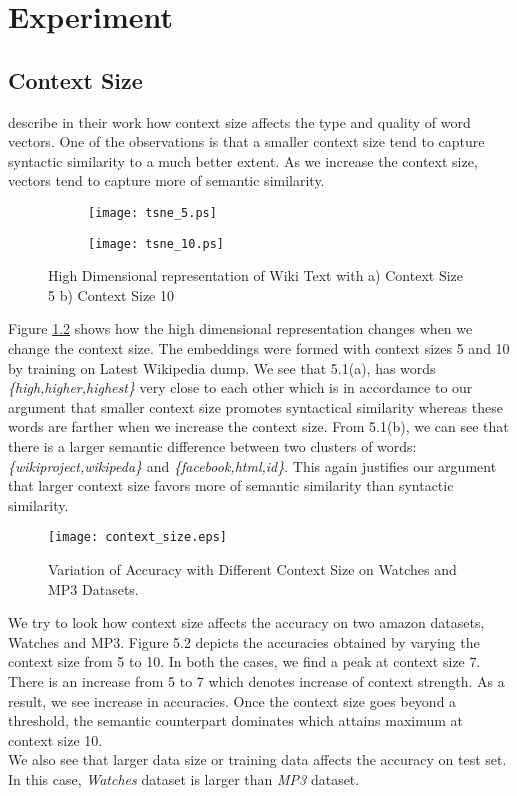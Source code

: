 \chapter{Experiment}
\section{Context Size}
\cite{Mikolov:13a} describe in their work how context size affects the type and quality of word vectors. One of the observations is that a smaller context size tend to capture syntactic similarity to a much better extent. As we increase the context size, vectors tend to capture more of semantic similarity.
\begin{figure}[]
	\centering
	\begin{subfigure}{\linewidth}
	\texttt{[image: tsne\_5.ps]}
	\caption{}
	\label{fig:5K_hindi_zoom1}
	\end{subfigure}
	\newline
	\begin{subfigure}{\linewidth}
	\texttt{[image: tsne\_10.ps]}
	\caption{}
	\end{subfigure}
	\newline
	\caption{High Dimensional representation of Wiki Text with a) Context Size 5 b) Context Size 10}
	\label{fig:tsne_5_10}
\end{figure}

Figure \ref{fig:tsne_5_10} shows how the high dimensional representation changes when we change the context size. The embeddings were formed with context sizes 5 and 10 by training on Latest Wikipedia dump. We see that 5.1(a), has words \emph{\{high,higher,highest\}} very close to each other which is in accordamce to our argument that smaller context size promotes syntactical similarity whereas these words are farther when we increase the context size. From 5.1(b), we can see that there is a larger semantic difference between two clusters of words:\emph{\{wikiproject,wikipeda\}} and \emph{\{facebook,html,id\}}. This again justifies our argument that larger context size favors more of semantic similarity than syntactic similarity.

\begin{figure}[ht!]
\centering
\texttt{[image: context\_size.eps]}
\caption{Variation of Accuracy with Different Context Size on Watches and MP3 Datasets. \label{fig:context_size}}
\end{figure}
We try to look how context size affects the accuracy on two amazon datasets, Watches and MP3.
Figure 5.2 depicts the accuracies obtained by varying the context size from 5 to 10. In both the cases, we find a peak at context size 7. There is an increase from 5 to 7 which denotes increase of context strength. As a result, we see increase in accuracies. Once the context size goes beyond a threshold, the semantic counterpart dominates which attains maximum at context size 10.\\
We also see that larger data size or training data affects the accuracy on test set. In this case, \emph{Watches} dataset is larger than \emph{MP3} dataset.\\


